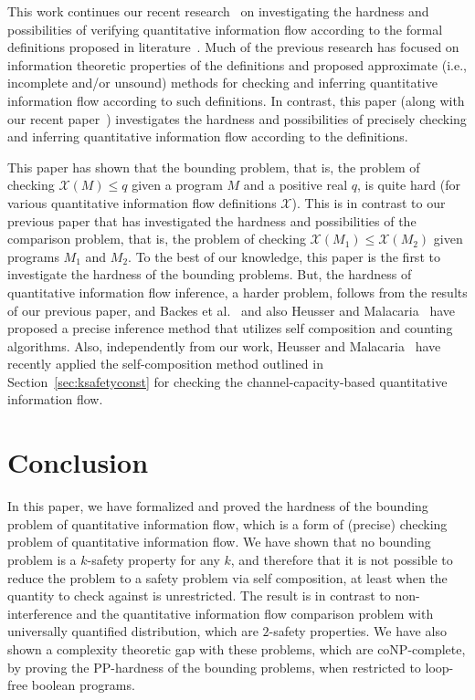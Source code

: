 \documentclass{llncs}
\begin{document}
This work continues our recent
research~\cite{DBLP:conf/csfw/yasuoka2010} on investigating the
hardness and possibilities of verifying quantitative information flow
according to the formal definitions proposed in
literature~\cite{clarkson:csf2005,denning82,clarkjcs2007,malacaria:popl2007,smith09,kopf07,DBLP:conf/sp/BackesKR09,mccamant:pldi2008,malacaria08,NMS2009,Braun:09:MFPS,DBLP:conf/csfw/KopfS10}.
Much of the previous research has focused on information theoretic
properties of the definitions and proposed approximate (i.e.,
incomplete and/or unsound) methods for checking and inferring
quantitative information flow according to such definitions.  In
contrast, this paper (along with our recent
paper~\cite{DBLP:conf/csfw/yasuoka2010}) investigates the hardness and
possibilities of precisely checking and inferring quantitative
information flow according to the definitions.

This paper has shown that the bounding problem, that is, the problem
of checking $\mathcal{X}(M) \leq q$ given a program $M$ and a positive
real $q$, is quite hard (for various quantitative information flow
definitions $\mathcal{X}$).  This is in contrast to our previous paper
that has investigated the hardness and possibilities of the comparison
problem, that is, the problem of checking $\mathcal{X}(M_1) \leq
\mathcal{X}(M_2)$ given programs $M_1$ and $M_2$.  To the best of our
knowledge, this paper is the first to investigate the hardness of the
bounding problems.  But, the hardness of quantitative information flow
inference, a harder problem, follows from the results of our previous
paper, and Backes et al.~\cite{DBLP:conf/sp/BackesKR09} and also
Heusser and Malacaria~\cite{DBLP:conf/ifip1-7/HeusserM09} have
proposed a precise inference method that utilizes self composition and
counting algorithms.  Also, independently from our work, Heusser and
Malacaria~\cite{DBLP:conf/acsac/Heusser2010} have recently applied the
self-composition method outlined in Section~\ref{sec:ksafetyconst} for
checking the channel-capacity-based quantitative information flow.

\section{Conclusion}

\label{sec:concl}

In this paper, we have formalized and proved the hardness of the
bounding problem of quantitative information flow, which is a form of
(precise) checking problem of quantitative information flow.  We have
shown that no bounding problem is a $k$-safety property for any $k$,
and therefore that it is not possible to reduce the problem to a
safety problem via self composition, at least when the quantity to
check against is unrestricted.  The result is in contrast to
non-interference and the quantitative information flow comparison
problem with universally quantified distribution, which are $2$-safety
properties.  We have also shown a complexity theoretic gap with these
problems, which are coNP-complete, by proving the PP-hardness of the
bounding problems, when restricted to loop-free boolean programs.
\end{document}
